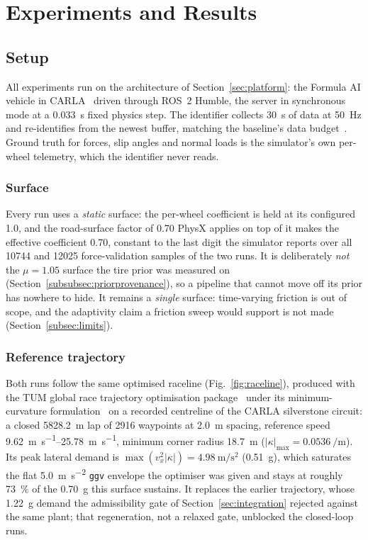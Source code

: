 \section{Experiments and Results}
\label{sec:results}

\subsection{Setup}
\label{subsec:setup}

All experiments run on the architecture of Section~\ref{sec:platform}: the
Formula AI vehicle in CARLA~\cite{carla2017} driven through ROS~2 Humble, the
server in synchronous mode at a \SI{0.033}{\second} fixed physics step. The
identifier collects \SI{30}{\second} of data at \SI{50}{\hertz} and
re-identifies from the newest buffer, matching the baseline's data
budget~\cite{ontrack2025}. Ground truth for forces, slip angles and normal
loads is the simulator's own per-wheel telemetry, which the identifier never
reads.

\subsubsection{Surface}
Every run uses a \emph{static} surface: the per-wheel coefficient is held at
its configured \num{1.0}, and the road-surface factor of \num{0.70} PhysX
applies on top of it makes the effective coefficient \num{0.70}, constant to
the last digit the simulator reports over all \num{10744} and \num{12025}
force-validation samples of the two runs. It is deliberately \emph{not} the
$\mu=\num{1.05}$ surface the tire prior was measured on
(Section~\ref{subsubsec:priorprovenance}), so a pipeline that cannot move off
its prior has nowhere to hide. It remains a \emph{single} surface: time-varying
friction is out of scope, and the adaptivity claim a friction sweep would
support is not made (Section~\ref{subsec:limits}).

\subsubsection{Reference trajectory}
\label{subsubsec:raceline}
Both runs follow the same optimised raceline (Fig.~\ref{fig:raceline}),
produced with the TUM global race trajectory optimisation
package~\cite{tumracetraj} under its minimum-curvature
formulation~\cite{heilmeier2020} on a recorded centreline of the CARLA
silverstone circuit: a closed \SI{5828.2}{\meter} lap of \num{2916} waypoints
at \SI{2.0}{\meter} spacing, reference speed
\SIrange{9.62}{25.78}{\meter\per\second}, minimum corner radius
\SI{18.7}{\meter} ($|\kappa|_{\max}=\SI{0.0536}{\per\meter}$). Its peak lateral
demand is $\max(v_{x}^{2}|\kappa|)=\SI{4.98}{\meter\per\second\squared}$
(\SI{0.51}{\g}), which saturates the flat
\SI{5.0}{\meter\per\second\squared} \texttt{ggv} envelope the optimiser was
given and stays at roughly \SI{73}{\percent} of the \SI{0.70}{\g} this
surface sustains. It replaces the earlier trajectory, whose \SI{1.22}{\g}
demand the admissibility gate of Section~\ref{sec:integration} rejected against
the same plant; that regeneration, not a relaxed gate, unblocked the
closed-loop runs.

